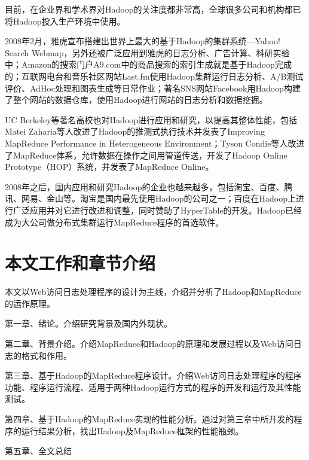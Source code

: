 目前，在企业界和学术界对Hadoop的关注度都非常高，全球很多公司和机构都已将Hadoop投入生产环境中使用。

2008年2月，雅虎宣布搭建出世界上最大的基于Hadoop的集群系统—Yahoo! Search Webmap\cite{site:Yahoo}，另外还被广泛应用到雅虎的日志分析、广告计算、科研实验中；Amazon的搜索门户A9.com中的商品搜索的索引生成就是基于Hadoop完成的；互联网电台和音乐社区网站Last.fm使用Hadoop集群运行日志分析、A/B测试评价、AdHoc处理和图表生成等日常作业；著名SNS网站Facebook用Hadoop构建了整个网站的数据仓库，使用Hadoop进行网站的日志分析和数据挖掘。

UC Berkeley等著名高校也对Hadoop进行应用和研究，以提高其整体性能，包括Matei Zaharia等人改进了Hadoop的推测式执行技术并发表了Improving MapReduce Performance in Heterogeneous Environment\cite{paper:Hadoop-Performance-in-Heterogeneous}；Tyson Condie等人改进了MapReduce体系，允许数据在操作之间用管道传送，开发了Hadoop Online Prototype（HOP）系统，并发表了MapReduce Online。

2008年之后，国内应用和研究Hadoop的企业也越来越多，包括淘宝、百度、腾讯、网易、金山等。淘宝是国内最先使用Hadoop的公司之一；百度在Hadoop上进行广泛应用并对它进行改进和调整，同时赞助了HyperTable的开发。Hadoop已经成为大公司做分布式集群运行MapReduce程序的首选软件。

\section{本文工作和章节介绍}
本文以Web访问日志处理程序的设计为主线，介绍并分析了Hadoop和MapReduce的运作原理。

第一章、绪论。介绍研究背景及国内外现状。

第二章、背景介绍。介绍MapReduce和Hadoop的原理和发展过程以及Web访问日志的格式和作用。

第三章、基于Hadoop的MapReduce程序设计。介绍Web访问日志处理程序的程序功能、程序运行流程、适用于两种Hadoop运行方式的程序的开发和运行及其性能测试。

第四章、基于Hadoop的MapReduce实现的性能分析。通过对第三章中所开发的程序的运行结果分析，找出Hadoop及MapReduce框架的性能瓶颈。

第五章、全文总结